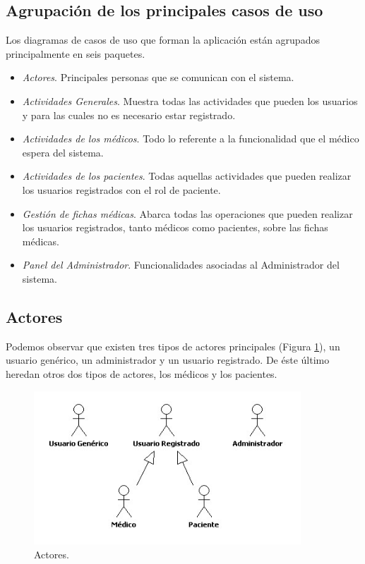 		\subsection{Agrupación de los principales casos de uso} %
		\label{sub:diagramas_de_casos_de_uso}

			Los diagramas de casos de uso que forman la aplicación están agrupados principalmente en seis paquetes.
			\begin{itemize}
				\item \textit{Actores}. Principales personas que se comunican con el sistema.
				\item \textit{Actividades Generales}. Muestra todas las actividades que pueden los usuarios y para las cuales no es necesario estar registrado.
				\item \textit{Actividades de los médicos}. Todo lo referente a la funcionalidad que el médico espera del sistema.
				\item \textit{Actividades de los pacientes}. Todas aquellas actividades que pueden realizar los usuarios registrados con el rol de paciente.
				\item \textit{Gestión de fichas médicas}. Abarca todas las operaciones que pueden realizar los usuarios registrados, tanto médicos como pacientes, sobre las fichas médicas.
				\item \textit{Panel del Administrador}. Funcionalidades asociadas al Administrador del sistema.
			\end{itemize}


			\subsection{Actores} %
			\label{sec:actores}
				Podemos observar que existen tres tipos de actores principales (Figura \ref{fig:actores}), un usuario genérico, un administrador y un usuario registrado. De éste último heredan otros dos tipos de actores, los médicos y los pacientes.
				\begin{figure}[H]
				  \centering
				    \includegraphics[width=10cm]{img/jpg/casos_uso/Actores.jpg}
				  \caption{Actores.}
				  \label{fig:actores}
				\end{figure}


